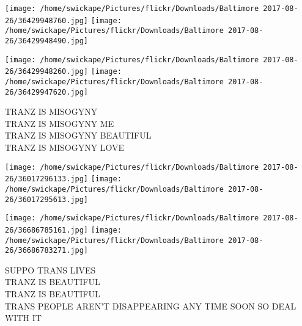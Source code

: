 \documentclass[10pt,letterpaper]{article}
\begin{document}
\texttt{[image: /home/swickape/Pictures/flickr/Downloads/Baltimore 2017-08-26/36429948760.jpg]}
\texttt{[image: /home/swickape/Pictures/flickr/Downloads/Baltimore 2017-08-26/36429948490.jpg]}

\texttt{[image: /home/swickape/Pictures/flickr/Downloads/Baltimore 2017-08-26/36429948260.jpg]}
\texttt{[image: /home/swickape/Pictures/flickr/Downloads/Baltimore 2017-08-26/36429947620.jpg]}

TRANZ IS MISOGYNY\\
TRANZ IS MISOGYNY ME\\
TRANZ IS MISOGYNY BEAUTIFUL\\
TRANZ IS MISOGYNY LOVE
\pagebreak

\texttt{[image: /home/swickape/Pictures/flickr/Downloads/Baltimore 2017-08-26/36017296133.jpg]}
\texttt{[image: /home/swickape/Pictures/flickr/Downloads/Baltimore 2017-08-26/36017295613.jpg]}

\texttt{[image: /home/swickape/Pictures/flickr/Downloads/Baltimore 2017-08-26/36686785161.jpg]}
\texttt{[image: /home/swickape/Pictures/flickr/Downloads/Baltimore 2017-08-26/36686783271.jpg]}

SUPPO TRANS LIVES\\
TRANZ IS BEAUTIFUL\\
TRANZ IS BEAUTIFUL\\
TRANS PEOPLE AREN'T DISAPPEARING ANY TIME SOON SO DEAL WITH IT
\pagebreak
\end{document}
